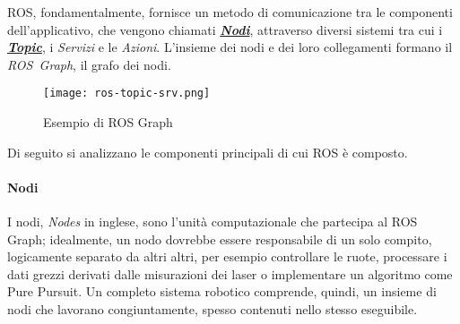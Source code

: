 \bigskip
ROS, fondamentalmente, fornisce un metodo di comunicazione tra le componenti dell'applicativo, che
vengono chiamati \hyperref[ros:nodes]{\textbf{\textit{Nodi}}}, attraverso diversi sistemi tra cui i
\hyperref[ros:topics]{\textbf{\textit{Topic}}}, i \textit{Servizi} e le \textit{Azioni}.
L'insieme dei nodi e dei loro collegamenti formano il \textit{ROS~Graph}, il grafo dei nodi.

\medskip
\begin{figure}[h]
	\centering
	\texttt{[image: ros-topic-srv.png]}
	\caption{Esempio di ROS Graph}
	\label{fig:ros-topic-srv}
\end{figure}
\noindent Di seguito si analizzano le componenti principali di cui ROS è composto.
\paragraph{Nodi \cite{undr-nodes} \cite{ros-nodes}} 
\label{ros:nodes}
I nodi, \textit{Nodes} in inglese, sono l'unità computazionale che partecipa al ROS Graph;
idealmente, un nodo dovrebbe essere responsabile di un solo compito, logicamente separato
da altri altri, per esempio controllare le ruote, processare i dati grezzi derivati dalle misurazioni
dei laser o implementare un algoritmo come Pure Pursuit.
Un completo sistema robotico comprende, quindi, un insieme di nodi che lavorano congiuntamente, spesso
contenuti nello stesso eseguibile.\\

